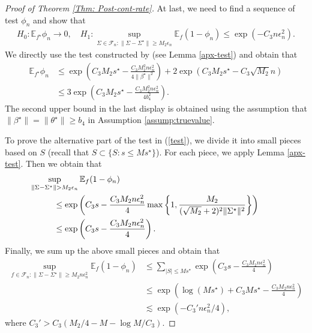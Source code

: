 \documentclass[pdftex, noinfoline, letter]{imsart}
\theoremstyle{plain}
\begin{document}
\begin{proof}[Proof of Theorem \ref{Thm: Post-cont-rate}]
At last, we need to find a sequence of test $\phi_n$ and show that
\begin{align}
\label{test}
H_0: \mathbb{E}_{f^\star} \phi_n \to 0, \quad
H_1: \sup_{\Sigma \in \mathcal{F}_n: \|\Sigma - \Sigma^\star\| \geq M_2\epsilon_n} \mathbb{E}_{f}(1-\phi_n) \leq \exp(-C_3 n\epsilon_n^2).
\end{align}
We directly use the test constructed by \citet{gao15} (see Lemma \ref{apx-test}) and obtain that 
\begin{align}
\mathbb{E}_{f^\star} \phi_n
& \leq \exp
\left(
C_3 M_2 s^\star - \frac{C_3 M_2^2 n\epsilon_n^2}{4\|\beta^\star\|^2}
\right)
+ 2\exp \left(C_3 M_2 s^\star - C_3 \sqrt{M_2} n \right)
\nonumber \\
& \leq 3\exp
\left(
C_3 M_2 s^\star - \frac{C_3 M_2^2 n\epsilon_n^2}{4b_4^2}
\right).
\label{pf-post-contr-rate-1.7}
\end{align}
The second upper bound in the last display is obtained using the assumption that $\|\beta^\star\| = \|\theta^\star\| \geq b_4$ in Assumption \ref{assump:truevalue}.

To prove the alternative part of the test in (\ref{test}), we divide it into small pieces based on $S$ (recall that $S \subset \{S:s \leq M s^\star\}$). For each piece, we apply Lemma \ref{apx-test}. Then we obtain that
\begin{align*}
&\hspace{-1cm}\sup_{\|\Sigma - \Sigma^\star\| > M_2 \epsilon_n} \mathbb{E}_{f} (1-\phi_n)\\
& \leq \exp\left(
C_3 s - \frac{C_3 M_2 n\epsilon_n^2}{4} 
\max\left\{
1, 
\frac{M_2}{(\sqrt{M_2} + 2)^2 \|\Sigma^\star\|^2}
\right\}
\right)\\
& \leq 
\exp\left(
C_3 s - \frac{C_3M_2 n \epsilon_n^2}{4}
\right).
\end{align*}
Finally, we sum up the above small pieces and obtain that
\begin{align*}
 \sup_{f \in \mathcal{F}_n: \|\Sigma - \Sigma^\star\| \geq M_2 n \epsilon_n^2}
 \mathbb{E}_f(1 - \phi_n)
& \leq 
 \sum_{|S| \leq M s^\star} 
 \exp\left(
C_3 s - \frac{C_3 M_2 n \epsilon_n^2}{4}
\right)\\
& \leq 
\exp\left( \log(M s^\star) + 
C_3 M s^\star - \frac{C_3 M_2 n \epsilon_n^2}{4}
\right) \\
& \lesssim 
\exp(- C_3' n \epsilon_n^2/4),
\end{align*}
where $C_3' > C_3(M_2/4 - M - \log M/C_3)$.


\end{proof}
\end{document}

